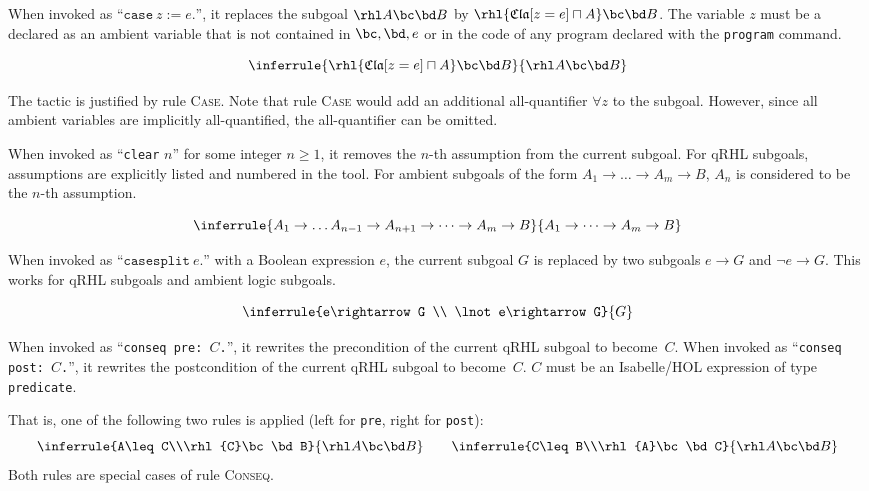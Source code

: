 \documentclass{article}
\renewcommand\ruleref[1]{rule \hbox{\textsc{#1}}}
\begin{document}
  


When invoked as ``$\mathtt{case}\ z := e\mathtt{.}$'',
it replaces the subgoal $\rhl A\bc\bd B$
by $\rhl{\mathfrak{Cla}[z=e]\sqcap A}\bc\bd B$.
The variable $z$
must be a declared as an ambient variable that is not contained in
$\bc,\bd,e$
or in the code of any program declared with the \texttt{program} command.

\[
\inferrule
{\rhl{\mathfrak{Cla}[z=e]\sqcap A}\bc\bd B}
{\rhl A\bc\bd B}
\]

The tactic is justified by \ruleref{Case}. Note that \ruleref{Case}
would add an additional all-quantifier $\forall z$
to the subgoal. However, since all ambient variables are implicitly
all-quantified, the all-quantifier can be omitted.



When invoked as ``\texttt{clear} $n$''
for some integer $n\geq 1$,
it removes the $n$-th
assumption from the current subgoal. For qRHL subgoals, assumptions
are explicitly listed and numbered in the tool. For ambient subgoals of the form
$A_1\to \dots \to A_m\to B$,
$A_n$ is considered to be the $n$-th assumption.

\[
  \inferrule
  {A_1\to \dots A_{n-1}\to A_{n+1}\to\dots \to A_m\to B}
  {A_1\to \dots \to A_m\to B}
\]



When invoked as ``$\mathtt{casesplit}\ e\mathtt{.}$''
with a Boolean expression $e$,
the current subgoal $G$
is replaced by two subgoals $e\rightarrow G$
and $\lnot e\rightarrow G$.
This works for qRHL subgoals and ambient logic subgoals.

\[
  \inferrule
  {e\rightarrow G
    \\
    \lnot e\rightarrow G}
  {G}
\]



When invoked as ``\texttt{conseq pre: $C$.}'',
it rewrites the precondition of the current qRHL subgoal to become~$C$.
When invoked as ``\texttt{conseq post: $C$.}'',
it rewrites the postcondition of the current qRHL subgoal to become~$C$.
$C$ must be an Isabelle/HOL expression of type \texttt{predicate}.

That is, one of the following two rules is applied (left for
\texttt{pre}, right for \texttt{post}):
\[
  \inferrule{A\leq C\\\rhl{C}\bc\bd B}{\rhl A\bc\bd B}
  \qquad
  \inferrule{C\leq B\\\rhl{A}\bc\bd C}{\rhl A\bc\bd B}
\]
%
Both rules are special cases of \ruleref{Conseq}.
\end{document}
